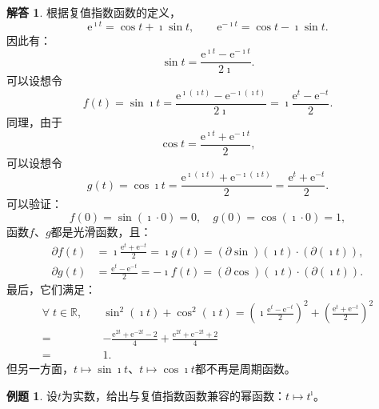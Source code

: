 \documentclass[12pt,UTF8]{ctexbook}
\newcommand{\e}{\mathrm{e}}
\theoremstyle{definition}
\newtheorem{et}{例题}[section]
\newtheorem*{so}{解答}
\theoremstyle{plain}
\begin{document}
\begin{so}
    根据复值指数函数的定义，
    $$ \e^{\imath t} = \cos{t} + \imath \sin{t}, \qquad \e^{-\imath t} = \cos{t} - \imath \sin{t}. $$
    因此有：
    $$ \sin{t} = \frac{\e^{\imath t} - \e^{-\imath t}}{2\imath}.$$
    可以设想令
    $$ f(t) = \sin{\imath t} = \frac{\e^{\imath (\imath t)} - \e^{-\imath (\imath t)}}{2\imath} = \imath \frac{\e^{t} - \e^{-t}}{2}.$$
    同理，由于
    $$ \cos{t} = \frac{\e^{\imath t} + \e^{-\imath t}}{2},$$
    可以设想令
    $$ g(t) = \cos{\imath t} = \frac{\e^{\imath (\imath t)} + \e^{-\imath (\imath t)}}{2} = \frac{\e^{t} + \e^{-t}}{2}.$$
    可以验证：
    $$ f(0) = \sin{(\imath \cdot 0)} = 0, \quad g(0)=\cos{(\imath \cdot 0)} = 1,$$
    函数$f$、$g$都是光滑函数，且：
    \begin{align*}
        \partial f(t) &= \imath \frac{\e^{t} + \e^{-t}}{2} = \imath g(t) = (\partial\sin)(\imath t)\cdot (\partial(\imath t)), \\
        \partial g(t) &= \frac{\e^{t} - \e^{-t}}{2} = -\imath f(t) = (\partial\cos)(\imath t)\cdot (\partial(\imath t)).
    \end{align*}
    最后，它们满足：
    \begin{align*}
        \forall \; t\in \mathbb{R}, \quad & \sin^2{(\imath t)} + \cos^2{(\imath t)} = \left(\imath \frac{\e^{t} - \e^{-t}}{2}\right)^2 + \left( \frac{\e^{t} + \e^{-t}}{2}\right)^2 \\
        =\;& -\frac{\e^{2t} + \e^{-2t} - 2}{4} + \frac{\e^{2t} + \e^{-2t} + 2}{4} \\
        =\;& 1.
    \end{align*}
    但另一方面，$t\mapsto \sin{\imath t}$、$t\mapsto \cos{\imath t}$都不再是周期函数。

\end{so}

\begin{et}
    设$t$为实数，给出与复值指数函数兼容的幂函数：$t\mapsto t^{\imath}$。
\end{et}
\end{document}
